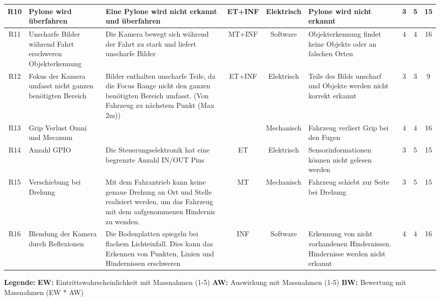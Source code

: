 \documentclass[../main.tex]{subfiles}
\begin{document}
\begin{landscape}
\begin{longtable}{|c|p{4cm}|p{6cm}|c|c|p{4cm}|c|c|c|}
R10 & Pylone wird überfahren & Eine Pylone wird nicht erkannt und überfahren & ET+INF & Elektrisch & Pylone wird nicht erkannt & 3 & 5 & 15 \\ \hline
R11 & Unscharfe Bilder während Fahrt erschweren Objekterkennung & Die Kamera bewegt sich während der Fahrt zu stark und liefert unscharfe Bilder & MT+INF & Software & Objekterkennung findet keine Objekte oder an falschen Orten & 4 & 4 & 16 \\ \hline
R12 & Fokus der Kamera umfasst nicht ganzen benötigten Bereich & Bilder enthalten unscharfe Teile, da die Focus Range nicht den ganzen benötigten Bereich umfasst. (Von Fahrzeug zu nächstem Punkt (Max 2m)) & ET+INF & Elektrisch & Teile des Bilds unscharf und Objekte werden nicht korrekt erkannt & 3 & 3 & 9 \\ \hline
R13 & Grip Verlust Omni und Mecanum & & & Mechanisch & Fahrzeug verliert Grip bei den Fugen & 4 & 4 & 16 \\ \hline
R14 & Anzahl GPIO & Die Steuerungselektronik hat eine begrenzte Anzahl IN/OUT Pins & ET & Elektrisch & Sensorinformationen können nicht gelesen werden & 3 & 5 & 15 \\ \hline
R15 & Verschiebung bei Drehung & Mit dem Fahrantrieb kann keine genaue Drehung an Ort und Stelle realisiert werden, um das Fahrzeug mit dem aufgenommenen Hindernis zu wenden. & MT & Mechanisch & Fahrzeug schiebt zur Seite bei Drehung & 3 & 5 & 15 \\ \hline

R16 & Blendung der Kamera durch Reflexionen & Die Bodenplatten spiegeln bei flachem Lichteinfall. Dies kann das Erkennen von Punkten, Linien und Hindernissen erschweren & INF & Software & Erkennung von nicht vorhandenen Hindernissen. Hindernisse werden nicht erkannt & 4 & 4 & 16 \\ \hline
\end{longtable}

\newpage

\textbf{Legende:}
\hspace{1cm}
\textbf{EW:} Eintrittswahrscheinlichkeit mit Massnahmen (1-5)
\hspace{1cm}
\textbf{AW:} Auswirkung mit Massnahmen  (1-5)
\hspace{1cm}
\textbf{BW:} Bewertung mit Massnahmen (EW * AW)


\end{landscape}
\end{document}
